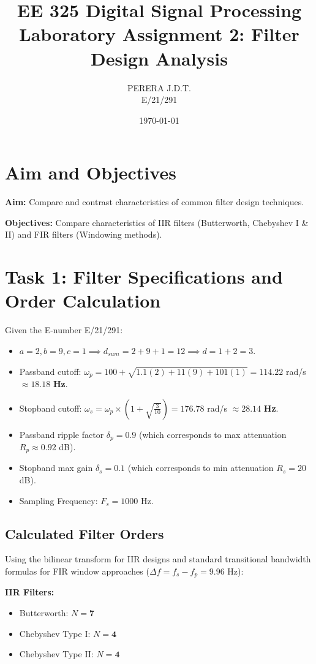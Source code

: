 \documentclass[11pt, a4paper]{article}
\title{EE 325 Digital Signal Processing \\ Laboratory Assignment 2: Filter Design Analysis}
\author{PERERA J.D.T. \\ E/21/291}
\date{\today}
\begin{document}
\maketitle

\section{Aim and Objectives}
\textbf{Aim:} Compare and contrast characteristics of common filter design techniques.

\textbf{Objectives:} Compare characteristics of IIR filters (Butterworth, Chebyshev I \& II) and FIR filters (Windowing methods).

\section{Task 1: Filter Specifications and Order Calculation}
Given the E-number E/21/291:
\begin{itemize}
    \item $a=2, b=9, c=1 \implies d_{sum} = 2+9+1=12 \implies d = 1+2=3$.
    \item Passband cutoff: $\omega_p = 100 + \sqrt{1.1(2) + 11(9) + 101(1)} = 114.22$ rad/s $\approx \mathbf{18.18}$ \textbf{Hz}.
    \item Stopband cutoff: $\omega_s = \omega_p \times \left(1 + \sqrt{\frac{3}{10}}\right) = 176.78$ rad/s $\approx \mathbf{28.14}$ \textbf{Hz}.
    \item Passband ripple factor $\delta_p = 0.9$ (which corresponds to max attenuation $R_p \approx 0.92$ dB).
    \item Stopband max gain $\delta_s = 0.1$ (which corresponds to min attenuation $R_s = 20$ dB).
    \item Sampling Frequency: $F_s = 1000$ Hz.
\end{itemize}

\subsection{Calculated Filter Orders}
Using the bilinear transform for IIR designs and standard transitional bandwidth formulas for FIR window approaches ($\Delta f = f_s - f_p = 9.96$ Hz):

\textbf{IIR Filters:}
\begin{itemize}
    \item Butterworth: $N = \mathbf{7}$
    \item Chebyshev Type I: $N = \mathbf{4}$
    \item Chebyshev Type II: $N = \mathbf{4}$
\end{itemize}
\end{document}
